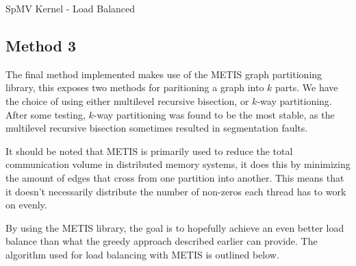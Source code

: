 \documentclass{article}
\begin{document}
    \begin{algorithm}[H]
        \caption{SpMV Kernel - Load Balanced}
        \SetAlgoVlined

    \end{algorithm}

    \subsection{Method 3}
    The final method implemented makes use of the METIS graph partitioning library, this exposes two methods for paritioning a graph into \( k \) parts. We have the choice of using either multilevel recursive bisection, or \( k \)-way partitioning. After some testing, \( k \)-way partitioning was found to be the most stable, as the multilevel recursive bisection sometimes resulted in segmentation faults. 
    \medskip

    It should be noted that METIS is primarily used to reduce the total communication volume in distributed memory systems, it does this by minimizing the amount of edges that cross from one partition into another. This means that it doesn't necessarily distribute the number of non-zeros each thread has to work on evenly. 
    \medskip

    By using the METIS library, the goal is to hopefully achieve an even better load balance than what the greedy approach described earlier can provide. The algorithm used for load balancing with METIS is outlined below.
\end{document}
